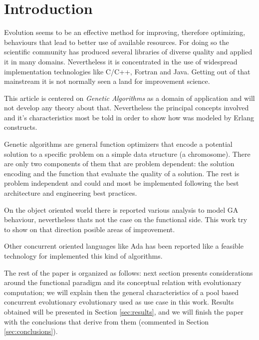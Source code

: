 \documentclass{acm_proc_article-sp}
\begin{document}




\section{Introduction}

Evolution seems to be an effective method for improving, therefore optimizing, behaviours that lead to better use of available resources. For doing so the scientific community has produced several libraries of diverse quality and applied it in many domains. Nevertheless it is concentrated in the use of widespread implementation technologies like C/C++, Fortran and Java. Getting out of that mainstream it is not normally seen a land for improvement science.

This article is centered on \emph{Genetic Algorithms} as a domain of application and will not develop any theory about that. Nevertheless the principal concepts involved and it's characteristics most be told in order to show how was modeled by Erlang constructs.

Genetic algorithms are general function optimizers that encode a potential solution to a specific problem on a simple data structure (a chromosome). There are only two components of them that are problem dependent: the solution encoding and the function that evaluate the quality of a solution. The rest is problem independent and could and most be implemented following the best architecture and engineering best practices.

On the object oriented world there is reported various analysis to model GA behaviour, nevertheless thats not the case on the functional side. This work try to show on that direction posible areas of improvement.

Other concurrent oriented languages like Ada \cite{Santos2002} has been reported like a feasible technology for implemented this kind of algorithms.

The rest of the paper is organized as follows: next section
presents considerations around the functional paradigm and its conceptual relation with evolutionary computation; we will
explain then the general characteristics of a pool based concurrent evolutionary evolutionary used as use case in this work. Results obtained will be presented in Section \ref{sec:results}, and we will finish the paper
with the conclusions that derive from them (commented in Section
\ref{sec:conclusions}).
\end{document}
